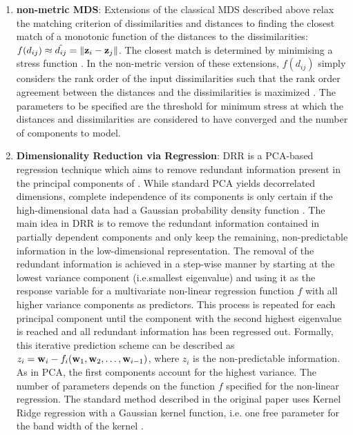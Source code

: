 \begin{enumerate}
\item\textbf{non-metric MDS}: Extensions of the classical MDS described above relax the matching criterion of dissimilarities and distances to finding the closest match of a monotonic function of the distances to the dissimilarities: \(f(d_{ij}) \approx \hat{d_{ij}} = \lVert \boldsymbol{\mathbf{z}}_{i} - \boldsymbol{\mathbf{z}}_{j}\rVert \). The closest match is determined by minimising a stress function \citep{Kruskal1964a,Kruskal1964b}. In the non-metric version of these extensions, \(f(d_{ij})\) simply considers the rank order of the input dissimilarities such that the rank order agreement between the distances and the dissimilarities is maximized \citep{Minchin1987}. The parameters to be specified are the threshold for minimum stress at which the distances and dissimilarities are considered to have converged and the number of components to model.

\item\textbf{Dimensionality Reduction via Regression}: DRR is a PCA-based regression technique which aims to remove redundant information present in the principal components  of . While standard PCA yields decorrelated dimensions, complete independence of its components is only certain if the high-dimensional data had a Gaussian probability density function \citep{Laparra2015}. The main idea in DRR is to remove the redundant information contained in partially dependent components and only keep the remaining, non-predictable information in the low-dimensional representation. The removal of the redundant information is achieved in a step-wise manner by starting at the lowest variance component (i.e.smallest eigenvalue) and using it as the response variable for a multivariate non-linear regression function \(f\) with all higher variance components as predictors. This process is repeated for each principal component until the component with the second highest eigenvalue is reached and all redundant information has been regressed out.  Formally, this iterative prediction scheme can be described as \(z_i = \boldsymbol{\mathbf{w}}_{i} - f_i(\boldsymbol{\mathbf{w}}_{1},\boldsymbol{\mathbf{w}}_{2}, \dots ,\allowbreak \boldsymbol{\mathbf{w}}_{ i-1})\), where \(z_i\) is the non-predictable information. As in PCA, the first components account for the highest variance. The number of parameters depends on the function \(f\) specified for the non-linear regression. The standard method described in the original paper uses Kernel Ridge regression with a Gaussian kernel function, i.e. one free parameter for the band width of the kernel \citep{Laparra2015}. 


\end{enumerate}

